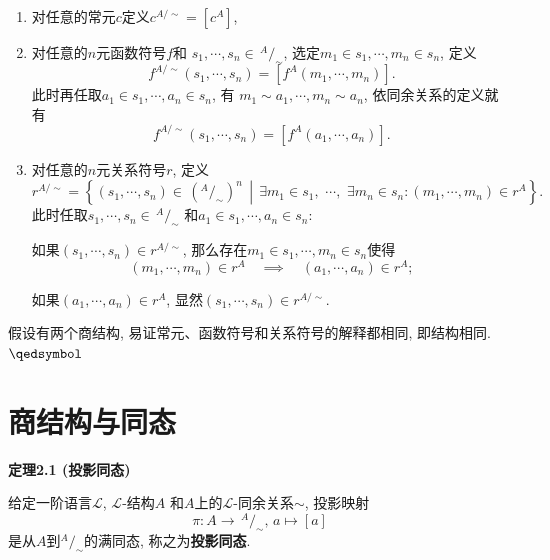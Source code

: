 \documentclass[UTF8]{ctexart}
\begin{document}
\begin{enumerate}
    \item 对任意的常元$c$定义$c^{A/\sim}=[c^A]$,
    \item 对任意的$n$元函数符号$f$和
    $s_1,\cdots,s_n\in\,\!^{\displaystyle A}\!/_{\displaystyle\sim}$,
    选定$m_1\in s_1,\cdots,m_n\in s_n$, 定义
    \[
        f^{A/\sim}(s_1,\cdots,s_n)=[f^A(m_1,\cdots,m_n)].
    \]
    此时再任取$a_1\in s_1,\cdots,a_n\in s_n$, 有
    $m_1\sim a_1,\cdots,m_n\sim a_n$, 依同余关系的定义就有
    \[
        f^{A/\sim}(s_1,\cdots,s_n)=[f^A(a_1,\cdots,a_n)].
    \]
    \item 对任意的$n$元关系符号$r$, 定义
    \[
        r^{A/\sim}=\left\{(s_1,\cdots,s_n)\in\,\!
        \left(^{\displaystyle A}\!/_{\displaystyle\sim}\right)^n\,\middle\vert\,
        \exists m_1\in s_1,\,\,\cdots,\,\,\exists m_n\in s_n:
        (m_1,\cdots,m_n)\in r^A\right\}.
    \]
    此时任取$s_1,\cdots,s_n\in\,\!^{\displaystyle A}\!/_{\displaystyle\sim}$
    和$a_1\in s_1,\cdots,a_n\in s_n$:

    \hspace{2.17em}
    如果$(s_1,\cdots,s_n)\in r^{A/\sim}$,
    那么存在$m_1\in s_1,\cdots,m_n\in s_n$使得
    \[
        (m_1,\cdots,m_n)\in r^A\quad\implies\quad(a_1,\cdots,a_n)\in r^A;
    \]

    \hspace{2.17em}
    如果$(a_1,\cdots,a_n)\in r^A$, 显然$(s_1,\cdots,s_n)\in r^{A/\sim}$.
\end{enumerate}


假设有两个商结构, 易证常元、函数符号和关系符号的解释都相同, 即结构相同.
\hfill $\qedsymbol$





\newpage

\section{商结构与同态}

\hypertarget{sec:定理2.1}{}
\noindent\textbf{定理2.1 (投影同态)}

给定一阶语言$\mathcal{L}$, $\mathcal{L}$-结构$A$
和$A$上的$\mathcal{L}$-同余关系$\sim$, 投影映射
\[
    \pi:A\to\,^{\displaystyle A}\!/_{\displaystyle\sim},\,a\mapsto[a]
\]
是从$A$到$^{\displaystyle A}\!/_{\displaystyle\sim}$的满同态,
称之为\textbf{投影同态}.

\vspace{10pt}
\end{document}
